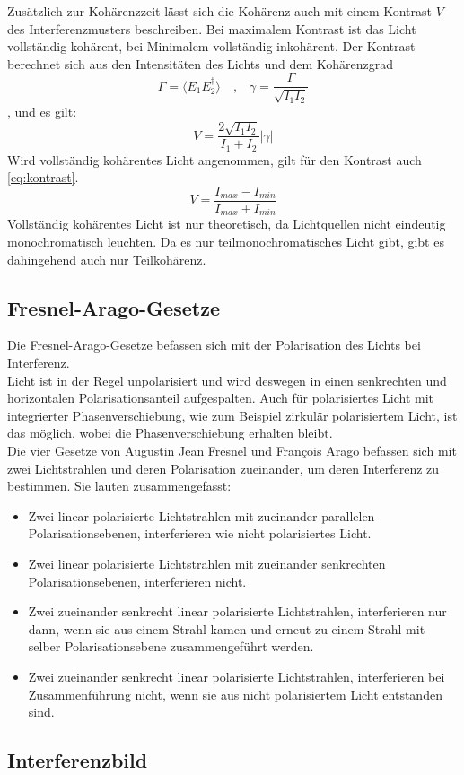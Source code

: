 Zusätzlich zur Kohärenzzeit lässt sich die Kohärenz auch mit einem Kontrast $V$ des Interferenzmusters beschreiben.
Bei maximalem Kontrast ist das Licht vollständig kohärent, bei Minimalem vollständig inkohärent.
Der Kontrast berechnet sich aus den Intensitäten des Lichts und dem Kohärenzgrad
\begin{equation}
    \Gamma = \langle E_1 E_2^\dagger \rangle \quad \text{,} \quad \gamma = \frac{\Gamma}{\sqrt{I_1 I_2}}
    \label{eq:grad}
\end{equation}
, und es gilt:
\begin{equation}
    V = \frac{2\sqrt{I_1I_2}}{I_1 + I_2}|\gamma|
    \label{eq:kontrast_formel}
\end{equation}
Wird vollständig kohärentes Licht angenommen, gilt für den Kontrast auch \autoref{eq:kontrast}.
\begin{equation}
    V = \frac{I_{max} - I_{min}}{I_{max} + I_{min}}
    \label{eq:kontrast}
\end{equation}
Vollständig kohärentes Licht ist nur theoretisch, da Lichtquellen nicht eindeutig monochromatisch leuchten.
Da es nur teilmonochromatisches Licht gibt, gibt es dahingehend auch nur Teilkohärenz.

\subsection{Fresnel-Arago-Gesetze}
Die Fresnel-Arago-Gesetze befassen sich mit der Polarisation des Lichts bei Interferenz.\\
Licht ist in der Regel unpolarisiert und wird deswegen in einen senkrechten und horizontalen Polarisationsanteil aufgespalten.
Auch für polarisiertes Licht mit integrierter Phasenverschiebung, wie zum Beispiel zirkulär polarisiertem Licht, ist das möglich, wobei die Phasenverschiebung erhalten bleibt.\\
Die vier Gesetze von Augustin Jean Fresnel und François Arago befassen sich mit zwei Lichtstrahlen und deren Polarisation zueinander, um deren Interferenz zu bestimmen.
Sie lauten zusammengefasst:
\begin{itemize}
    \item Zwei linear polarisierte Lichtstrahlen mit zueinander parallelen Polarisationsebenen, interferieren wie nicht polarisiertes Licht.
    \item Zwei linear polarisierte Lichtstrahlen mit zueinander senkrechten Polarisationsebenen, interferieren nicht.
    \item Zwei zueinander senkrecht linear polarisierte Lichtstrahlen, interferieren nur dann, wenn sie aus einem Strahl kamen und erneut zu einem Strahl mit selber Polarisationsebene zusammengeführt werden.
    \item Zwei zueinander senkrecht linear polarisierte Lichtstrahlen, interferieren bei Zusammenführung nicht, wenn sie aus nicht polarisiertem Licht entstanden sind.
\end{itemize}

\subsection{Interferenzbild}
